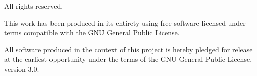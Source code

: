 \clearpage
    \null
    \vfill
    \begin{center}
        \textcopyright \the\year
        \par
        \theAuthor
        \par
        All rights reserved.
        \par
        This work has been produced in its entirety using free software licensed under terms compatible with the GNU General Public License.
        \par
        All software produced in the context of this project is hereby pledged for release at the earliest opportunity under the terms of the GNU General Public License, version 3.0.
        \par
        \doclicenseThis
    \end{center}
\clearpage
